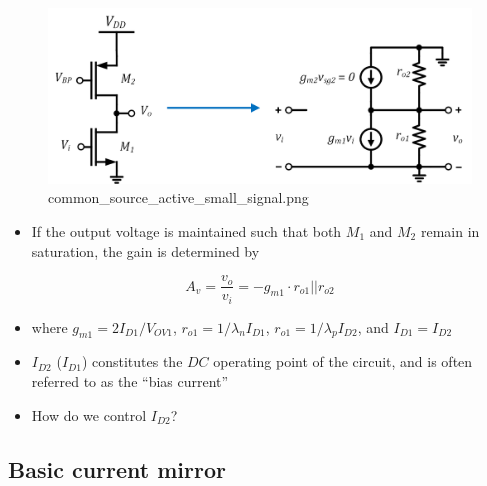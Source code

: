 \documentclass[11pt]{article}
\providecommand{\tightlist}{%
      \setlength{\itemsep}{0pt}\setlength{\parskip}{0pt}}
\begin{document}
    \begin{figure}
\centering
\includegraphics{common_source_active_small_signal.png}
\caption{common\_source\_active\_small\_signal.png}
\end{figure}

    \begin{itemize}
\tightlist
\item
  If the output voltage is maintained such that both \(M_1\) and \(M_2\)
  remain in saturation, the gain is determined by
\end{itemize}

\begin{equation}
A_v = \dfrac{v_o}{v_i} = -g_{m1}\cdot r_{o1}||r_{o2}
\end{equation}

\begin{itemize}
\tightlist
\item
  where \(g_{m1} = 2I_{D1}/V_{OV1}\), \(r_{o1} = 1/\lambda_n I_{D1}\),
  \(r_{o1} = 1/\lambda_p I_{D2}\), and \(I_{D1} = I_{D2}\)
\item
  \(I_{D2}\) (\(I_{D1}\)) constitutes the \(DC\) operating point of the
  circuit, and is often referred to as the ``bias current''
\item
  How do we control \(I_{D2}\)?
\end{itemize}

    \hypertarget{basic-current-mirror}{%
\subsection{Basic current mirror}\label{basic-current-mirror}}
\end{document}
